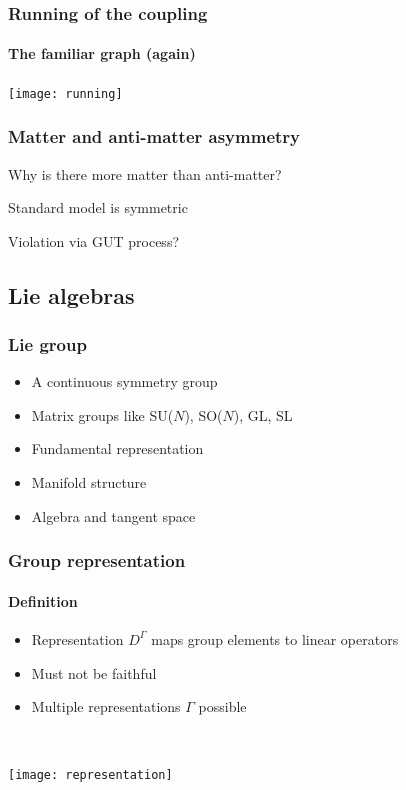 \documentclass[english, fleqn]{beamer}
\begin{document}
\begin{frame}
    \frametitle{Running of the coupling}
    \framesubtitle{The familiar graph (again)}

    {
        \centering
        \texttt{[image: running]}
    }

    \parencite{Peskin/1997ez}
\end{frame}

\begin{frame}

    \frametitle{Matter and anti-matter asymmetry}

    Why is there more matter than anti-matter?

    Standard model is symmetric

    Violation via GUT process?
\end{frame}

\subsection{Lie algebras}

\begin{frame}
    \frametitle{Lie group}

    \begin{itemize}
        \item A continuous symmetry group
        \item Matrix groups like SU($N$), SO($N$), GL, SL
        \item Fundamental representation
        \item Manifold structure
        \item Algebra and tangent space
    \end{itemize}

\end{frame}

\begin{frame}
    \frametitle{Group representation}
    \framesubtitle{Definition}

    \begin{itemize}
        \item Representation $D^\Gamma$ maps group elements to linear operators
        \item Must not be faithful
        \item Multiple representations $\Gamma$ possible
    \end{itemize}

    \

    \begin{center}
        \texttt{[image: representation]}
    \end{center}
\end{frame}
\end{document}
